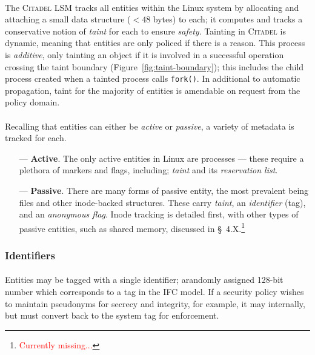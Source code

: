 \paragraph{} The \textsc{Citadel} LSM tracks all entities within the Linux system by allocating and attaching a small data structure ($<48$ bytes) to each; it computes and tracks a conservative notion of \textit{taint} for each to ensure \textit{safety}. Tainting in \textsc{Citadel} is dynamic, meaning that entities are only policed if there is a reason. This process is \textit{additive}, only tainting an object if it is involved in a successful operation crossing the taint boundary (Figure~\ref{fig:taint-boundary}); this includes the child process created when a tainted process calls \texttt{fork()}. In additional to automatic propagation, taint for the majority of entities is amendable on request from the policy domain.

\paragraph{} Recalling that entities can either be \textit{active} or \textit{passive}, a variety of metadata is tracked for each.

\begin{enumerate}
    \item[---]\textbf{Active}. The only active entities in Linux are processes --- these require a plethora of markers and flags, including; \textit{taint} and its \textit{reservation list}.
    \item[---] \textbf{Passive}. There are many forms of passive entity, the most prevalent being files and other inode-backed structures. These carry \textit{taint}, an \textit{identifier} (tag), and an \textit{anonymous flag}. Inode tracking is detailed first, with other types of passive entities, such as shared memory, discussed in §~4.X.\footnote{\textcolor{red}{Currently missing...}}
\end{enumerate}

\subsubsection{Identifiers}
\paragraph{} Entities may be tagged with a single identifier; arandomly assigned 128-bit number which corresponds to a tag in the IFC model. If a security policy wishes to maintain pseudonyms for secrecy and integrity, for example, it may internally, but must convert back to the system tag for enforcement.


